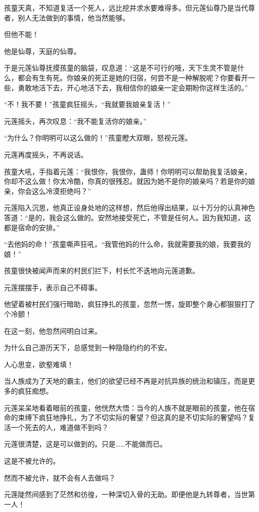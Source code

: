 \begin{this_body}
孩童天真，不知道复活一个死人，远比挖井求水要难得多。但元莲仙尊乃是当代尊者，别人无法做到的事情，他当然能够。

但他不能！

他是仙尊，天庭的仙尊。

于是元莲仙尊抚摸孩童的脑袋，叹息道：“这是不可行的哦，天下生灵不管是什么，都会有生有死。你娘亲的死正是她的归宿，何尝不是一种解脱呢？你要看开一些，勇敢地活下去，开心地活下去，我相信你的娘亲一定会期盼你这样生活的。”

“不！我不要！”孩童疯狂摇头，“我就要我娘亲复活！”

元莲摇头，再次叹息：“我不能复活你的娘亲。”

“为什么？你明明可以这么做的！”孩童瞪大双眼，怒视元莲。

元莲再度摇头，不再说话。

孩童大吼，手指着元莲：“我恨你，我恨你，蛊师！你明明可以帮助我复活娘亲，你却不这么做！你太冷酷，你真的很残忍。就因为她不是你的娘亲吗？若是你的娘亲，你会这么冷漠拒绝吗？”

元莲陷入沉思，他真正设身处地的这样想，然后他得出结果，以十万分的认真神色答道：“是的，我会这么做的。安然地接受死亡，不管是任何人。因为我知道，这都是宿命的安排。”

“去他妈的命！”孩童嘶声狂吼，“我管他妈的什么命，我就需要我的娘，我要我的娘！”

孩童很快被闻声而来的村民们拦下，村长忙不迭地向元莲道歉。

元莲摆摆手，表示自己不碍事。

他望着被村民们强行暗助，疯狂挣扎的孩童，忽然一愣，旋即整个身心都狠狠打了个冷颤！

在这一刻，他忽然间明白过来。

为什么自己游历天下，总感觉到一种隐隐约约的不安。

人心思变，欲壑难填！

当人族成为了天地的霸主，他们的欲望已经不再是对抗异族的统治和镇压，而是更多的疯狂痴想。

元莲呆呆地看着眼前的孩童，他恍然大悟：当今的人族不就是眼前的孩童，他在宿命的束缚下疯狂地挣扎，为了不切实际的奢望？但这真的是不切实际的奢望吗？复活一个死去的人，难道做不到吗？

元莲很清楚，这是可以做到的。只是……不能做而已。

这是不被允许的。

然而不被允许，就不会有人去做吗？

元莲陡然间感到了茫然和彷徨，一种深切入骨的无助。即便他是九转尊者，当世第一人！


\end{this_body}

